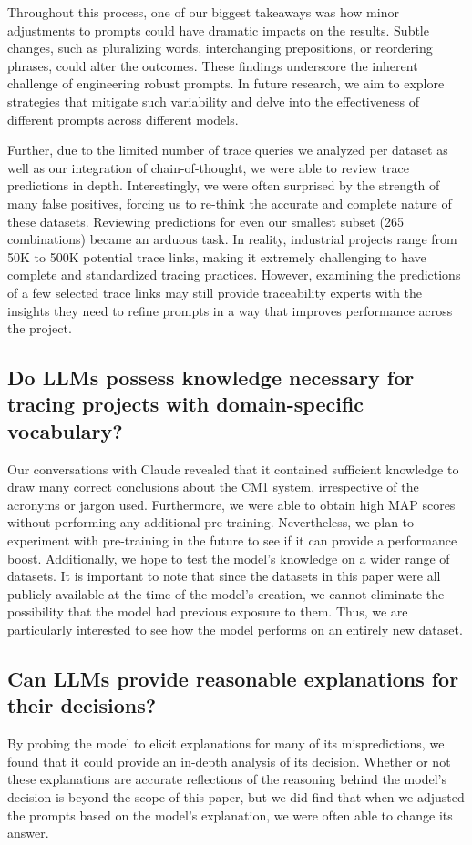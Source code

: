 Throughout this process, one of our biggest takeaways was how minor adjustments to prompts could have dramatic impacts on the results. Subtle changes, such as pluralizing words, interchanging prepositions, or reordering phrases, could alter the outcomes. These findings underscore the inherent challenge of engineering robust prompts. In future research, we aim to explore strategies that mitigate such variability and delve into the effectiveness of different prompts across different models.

Further, due to the limited number of trace queries we analyzed per dataset as well as our integration of chain-of-thought, we were able to review trace predictions in depth. Interestingly, we were often surprised by the strength of many false positives, forcing us to re-think the accurate and complete nature of these datasets. Reviewing predictions for even our smallest subset (265 combinations) became an arduous task.  In reality, industrial projects range from 50K to 500K potential trace links, making it extremely challenging to have complete and standardized tracing practices. However, examining the predictions of a few selected trace links may still provide traceability experts with the insights they need to refine prompts in a way that improves performance across the project.

\subsection{Do LLMs possess knowledge necessary for tracing projects with domain-specific vocabulary?}
Our conversations with Claude revealed that it contained sufficient knowledge to draw many correct conclusions about the CM1 system, irrespective of the acronyms or jargon used. Furthermore, we were able to obtain high MAP scores without performing any additional pre-training.
Nevertheless, we plan to experiment with pre-training in the future to see if it can provide a performance boost. Additionally, we hope to test the model's knowledge on a wider range of datasets. It is important to note that since the datasets in this paper were all publicly available at the time of the model's creation, we cannot eliminate the possibility that the model had previous exposure to them. Thus, we are particularly interested to see how the model performs on an entirely new dataset.


\subsection{Can LLMs provide reasonable explanations for their decisions?}
By probing the model to elicit explanations for many of its mispredictions, we found that it could provide an in-depth analysis of its decision. Whether or not these explanations are accurate reflections of the reasoning behind the model's decision is beyond the scope of this paper, but we did find that when we adjusted the prompts based on the model's explanation, we were often able to change its answer. 


